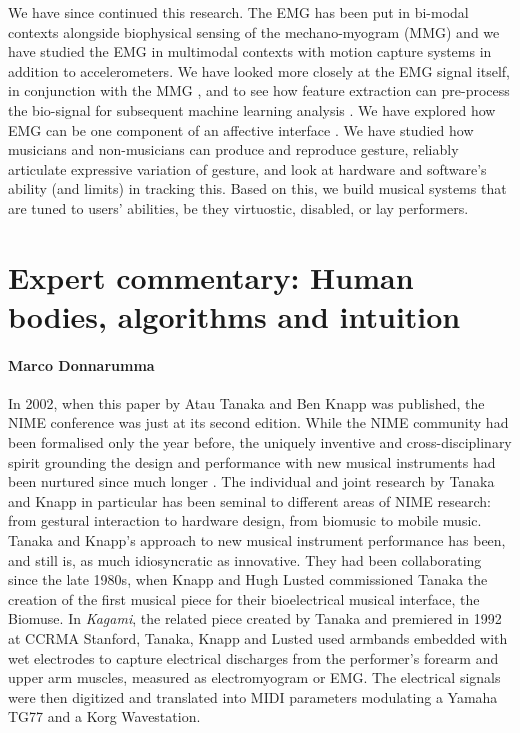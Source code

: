 We have since continued this research. The EMG has been put in bi-modal contexts alongside biophysical sensing of the mechano-myogram (MMG) and we have studied the EMG in multimodal contexts with motion capture systems in addition to accelerometers. We have looked more closely at the EMG signal itself, in conjunction with the MMG \cite{Donnarumma:2013}, and to see how feature extraction can pre-process the bio-signal for subsequent machine learning analysis \cite{Caramiaux:2015}.  We have explored how EMG can be one component of an affective interface \cite{Knapp:2011}. We have studied how musicians and non-musicians can produce and reproduce gesture, reliably articulate expressive variation of gesture, and look at hardware and software's ability (and limits) in tracking this. Based on this, we build musical systems that are tuned to users' abilities, be they virtuostic, disabled, or lay performers.


\section*{Expert commentary: Human bodies, algorithms and intuition}
\paragraph{Marco Donnarumma}

In 2002, when this paper by Atau Tanaka and Ben Knapp was published, the NIME conference was just at its second edition. While the NIME community had been formalised only the year before, the uniquely inventive and cross-disciplinary spirit grounding the design and performance with new musical instruments had been nurtured since much longer \cite{Krefeld:1990,Moore:1988}. The individual and joint research by Tanaka and Knapp in particular has been seminal to different areas of NIME research: from gestural interaction to hardware design, from biomusic to mobile music. Tanaka and Knapp's approach to new musical instrument performance has been, and still is, as much idiosyncratic as innovative. They had been collaborating since the late 1980s, when Knapp and Hugh Lusted commissioned Tanaka the creation of the first musical piece for their bioelectrical musical interface, the Biomuse. In \textit{Kagami}, the related piece created by Tanaka and premiered in 1992 at CCRMA Stanford, Tanaka, Knapp and Lusted used armbands embedded with wet electrodes to capture electrical discharges from the performer's forearm and upper arm muscles, measured as electromyogram or EMG. The electrical signals were then digitized and translated into MIDI parameters modulating a Yamaha TG77 and a Korg Wavestation.

